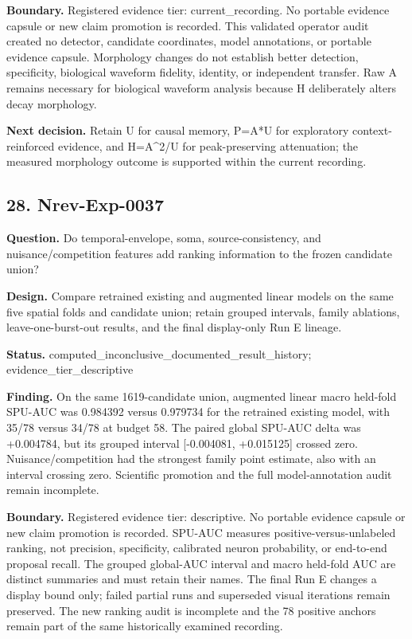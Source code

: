\textbf{Boundary.} Registered evidence tier: current\_recording. No portable evidence capsule or new claim promotion is recorded. This validated operator audit created no detector, candidate coordinates, model annotations, or portable evidence capsule. Morphology changes do not establish better detection, specificity, biological waveform fidelity, identity, or independent transfer. Raw A remains necessary for biological waveform analysis because H deliberately alters decay morphology.

\textbf{Next decision.} Retain U for causal memory, P=A*U for exploratory context-reinforced evidence, and H=A^2/U for peak-preserving attenuation; the measured morphology outcome is supported within the current recording.

\subsection{28. Nrev-Exp-0037}

\textbf{Question.} Do temporal-envelope, soma, source-consistency, and nuisance/competition features add ranking information to the frozen candidate union?

\textbf{Design.} Compare retrained existing and augmented linear models on the same five spatial folds and candidate union; retain grouped intervals, family ablations, leave-one-burst-out results, and the final display-only Run E lineage.

\textbf{Status.} computed\_inconclusive\_documented\_result\_history; evidence\_tier\_descriptive

\textbf{Finding.} On the same 1619-candidate union, augmented linear macro held-fold SPU-AUC was 0.984392 versus 0.979734 for the retrained existing model, with 35/78 versus 34/78 at budget 58. The paired global SPU-AUC delta was +0.004784, but its grouped interval [-0.004081, +0.015125] crossed zero. Nuisance/competition had the strongest family point estimate, also with an interval crossing zero. Scientific promotion and the full model-annotation audit remain incomplete.

\textbf{Boundary.} Registered evidence tier: descriptive. No portable evidence capsule or new claim promotion is recorded. SPU-AUC measures positive-versus-unlabeled ranking, not precision, specificity, calibrated neuron probability, or end-to-end proposal recall. The grouped global-AUC interval and macro held-fold AUC are distinct summaries and must retain their names. The final Run E changes a display bound only; failed partial runs and superseded visual iterations remain preserved. The new ranking audit is incomplete and the 78 positive anchors remain part of the same historically examined recording.


